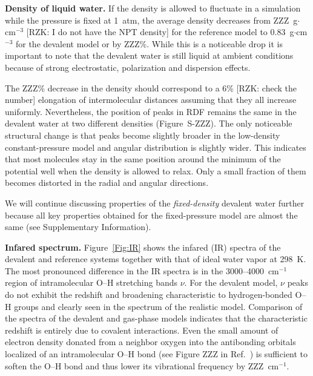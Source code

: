 \documentclass[aps,prl,reprint,amsmath,amssymb]{revtex4-1}
\begin{document}

\textbf{Density of liquid water.} If the density is allowed to fluctuate in a simulation while the pressure is fixed at 1~atm, the average density decreases from ZZZ~g$\cdot$cm$^{-3}$ [RZK: I do not have the NPT density] for the reference model to 0.83~g$\cdot$cm$^{-3}$ for the devalent model or by ZZZ\%. 
While this is a noticeable drop it is important to note that the devalent water is still liquid at ambient conditions because of strong electrostatic, polarization and dispersion effects. 

The ZZZ\% decrease in the density should correspond to a 6\% [RZK: check the number] elongation of intermolecular distances assuming that they all increase uniformly. Nevertheless, the position of peaks in RDF remains the same in the devalent water at two different densities (Figure~S-ZZZ). The only noticeable structural change is that peaks become slightly broader in the low-density constant-pressure model and angular distribution is slightly wider. This indicates that most molecules stay in the same position around the minimum of the potential well when the density is allowed to relax. Only a small fraction of them becomes distorted in the radial and angular directions. 

We will continue discussing properties of the \emph{fixed-density} devalent water further because all key properties obtained for the fixed-pressure model are almost the same (see Supplementary Information).


\textbf{Infared spectrum.} Figure~\ref{Fig:IR} shows the infared (IR) spectra of the devalent and reference systems together with that of ideal water vapor at 298~K. 
The most pronounced difference in the IR spectra is in the 3000--4000~cm$^{-1}$ region of intramolecular O--H stretching bands $\nu$. 
For the devalent model, $\nu$ peaks do not exhibit the redshift and broadening characteristic to hydrogen-bonded O--H groups and clearly seen in the spectrum of the realistic model. 
Comparison of the spectra of the devalent and gas-phase models indicates that the characteristic redshift is entirely due to covalent interactions. 
Even the small amount of electron density donated from a neighbor oxygen into the antibonding orbitals localized of an intramolecular O--H bond (see Figure ZZZ in Ref.~) is sufficient to soften the O--H bond and thus lower its vibrational frequency by ZZZ~cm$^{-1}$. 
\end{document}
